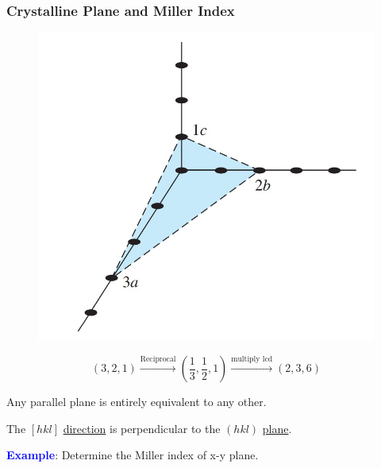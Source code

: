 \documentclass{beamer}
\begin{document}
    \begin{frame} \frametitle{Crystalline Plane and Miller Index}
        \begin{figure}[H]
            \centering
            \includegraphics[width=0.4\linewidth]{Miller-index-1.jpg}
            \label{fig:Miller-index-1.jpg}
        \end{figure}
        \begin{equation*}
            (3,2,1) \stackrel{\text{Reciprocal}}{\longrightarrow} (\frac{1}{3} , \frac{1}{2} , 1) \stackrel{\text{multiply lcd}}{\longrightarrow} (2,3,6)
        \end{equation*}
        \par Any parallel plane is entirely equivalent to any other.
        \par The $[hkl]$ \underline{direction} is perpendicular to the $(hkl)$ \underline{plane}. \\[1em]
        \par \textbf{\textcolor{blue}{Example}}: Determine the Miller index of x-y plane.
    \end{frame}
\end{document}
